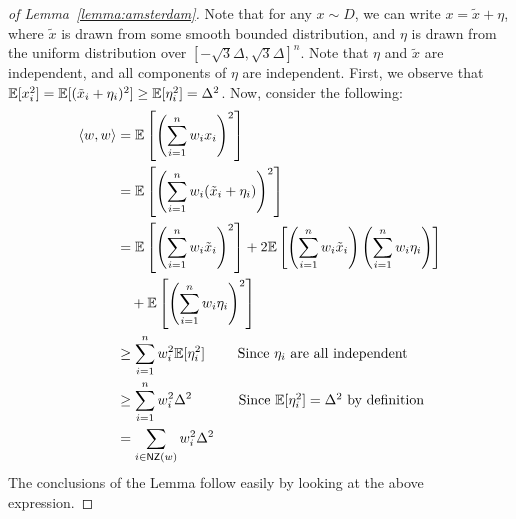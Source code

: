 \begin{proof}[of Lemma~\ref{lemma:amsterdam}] Note that for any $x \sim
D$, we can write $x = \tilde{x} + \eta$, where $\tilde{x}$ is drawn from some
smooth bounded distribution, and $\eta$ is drawn from the uniform distribution
over $[-\sqrt{3} \Delta, \sqrt{3} \Delta]^n$. Note that $\eta$ and $\tilde{x}$
are independent, and all components of $\eta$ are independent. First, we observe
that $\mathbb{E}[x_i^2] = \mathbb{E}[(\tilde{x}_i + \eta_i)^2] \geq \mathbb{E}[\eta_i^2] = \Delta^2$.
Now, consider the following:
\begin{align*}
\langle w, w \rangle &= \mathbb{E}\left[\left(\sum_{i=1}^n w_i x_i\right)^2\right] \\
&= \mathbb{E}\left[\left(\sum_{i = 1}^n w_i (\tilde{x}_i + \eta_i) \right)^2 \right] \\ 
&= \mathbb{E}\left[\left(\sum_{i=1}^n w_i \tilde{x}_i\right)^2\right] +
2\mathbb{E}\left[\left(\sum_{i=1}^n w_i \tilde{x}_i \right)\left(\sum_{i=1}^n w_i
\eta_i\right) \right] \\
\mbox{}&\quad + \mathbb{E}\left[\left(\sum_{i=1}^n w_i \eta_i\right)^2\right] \\
&\geq \sum_{i=1}^n w_i^2 \mathbb{E}[\eta_i^2] \mbox{~~~~~~~Since $\eta_i$ are all independent}
\\
&\geq \sum_{i = 1}^n w_i^2 \Delta^2  \mbox{~~~~~~~~~~Since $\mathbb{E}[\eta_i^2] = \Delta^2$ by
definition} \\
&= \sum_{i \in \mathsf{NZ}(w)} w_i^2 \Delta^2
\end{align*}
The conclusions of the Lemma follow easily by looking at the above expression.
\end{proof}
